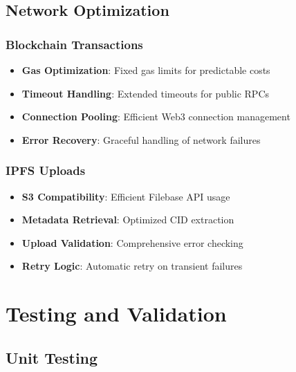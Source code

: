 \documentclass[12pt,a4paper]{article}
\begin{document}
\subsection{Network Optimization}

\subsubsection{Blockchain Transactions}
\begin{itemize}
    \item \textbf{Gas Optimization}: Fixed gas limits for predictable costs
    \item \textbf{Timeout Handling}: Extended timeouts for public RPCs
    \item \textbf{Connection Pooling}: Efficient Web3 connection management
    \item \textbf{Error Recovery}: Graceful handling of network failures
\end{itemize}

\subsubsection{IPFS Uploads}
\begin{itemize}
    \item \textbf{S3 Compatibility}: Efficient Filebase API usage
    \item \textbf{Metadata Retrieval}: Optimized CID extraction
    \item \textbf{Upload Validation}: Comprehensive error checking
    \item \textbf{Retry Logic}: Automatic retry on transient failures
\end{itemize}

\section{Testing and Validation}

\subsection{Unit Testing}
\end{document}
